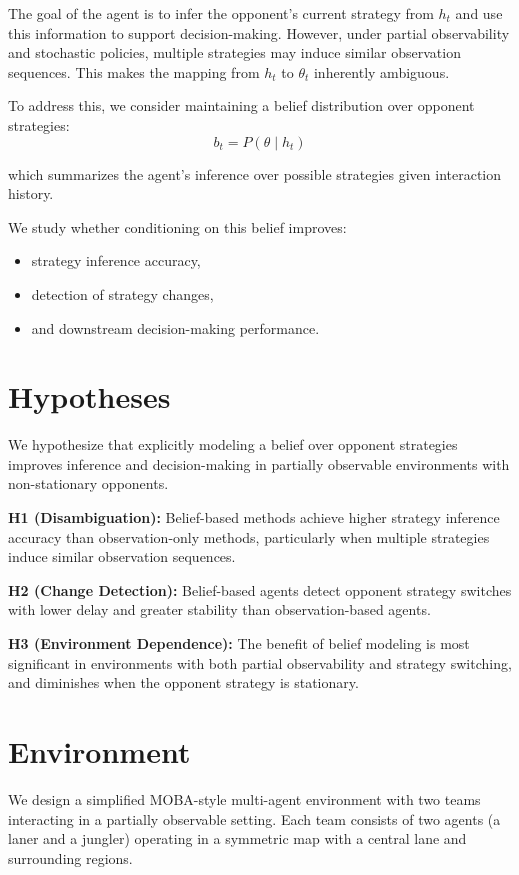 \documentclass{article}
\begin{document}
The goal of the agent is to infer the opponent’s current strategy from $h_t$ and use this information to support decision-making. However, under partial observability and stochastic policies, multiple strategies may induce similar observation sequences. This makes the mapping from $h_t$ to $\theta_t$ inherently ambiguous.

To address this, we consider maintaining a belief distribution over opponent strategies:
\[
b_t = P(\theta \mid h_t)
\]

which summarizes the agent’s inference over possible strategies given interaction history.

We study whether conditioning on this belief improves:
\begin{itemize}
    \item strategy inference accuracy,
    \item detection of strategy changes,
    \item and downstream decision-making performance.
\end{itemize}

\section{Hypotheses}

We hypothesize that explicitly modeling a belief over opponent strategies improves inference and decision-making in partially observable environments with non-stationary opponents.

\textbf{H1 (Disambiguation):} Belief-based methods achieve higher strategy inference accuracy than observation-only methods, particularly when multiple strategies induce similar observation sequences.

\textbf{H2 (Change Detection):} Belief-based agents detect opponent strategy switches with lower delay and greater stability than observation-based agents.

\textbf{H3 (Environment Dependence):} The benefit of belief modeling is most significant in environments with both partial observability and strategy switching, and diminishes when the opponent strategy is stationary.

\section{Environment}

We design a simplified MOBA-style multi-agent environment with two teams interacting in a partially observable setting. Each team consists of two agents (a laner and a jungler) operating in a symmetric map with a central lane and surrounding regions.
\end{document}
